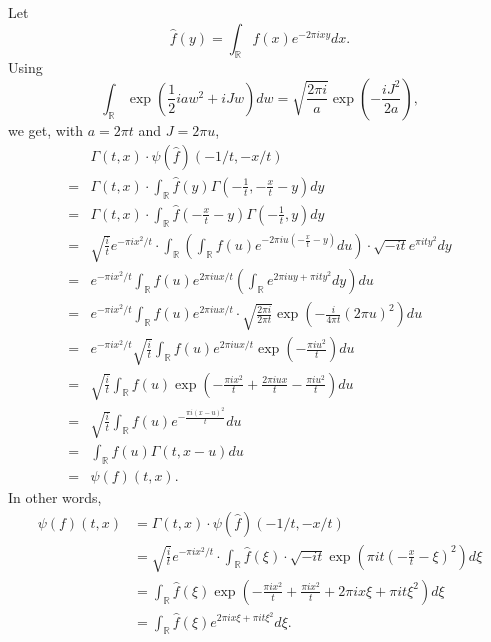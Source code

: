\documentclass{article}
\theoremstyle{definition}
\begin{document}
Let
\[
\widehat{f}(y) = \int_{\mathbb{R}} f(x) e^{-2\pi ixy} dx.
\]
Using
\[
\int_{\mathbb{R}} \exp\left(\frac{1}{2}iaw^2 + iJw\right) dw = \sqrt{ \frac{2\pi i}{a}} \exp\left(-\frac{iJ^2}{2a}\right),
\]
we get, with $a=2\pi t$ and $J=2\pi u$,
\[
\begin{split}
&\Gamma(t,x) \cdot \psi(\widehat{f})(-1/t,-x/t)\\
=&\Gamma(t,x) \cdot \int_{\mathbb{R}} \widehat{f}(y)
\Gamma\left(-\frac{1}{t},-\frac{x}{t}-y\right) dy\\
=&\Gamma(t,x) \cdot \int_{\mathbb{R}} \widehat{f}\left(-\frac{x}{t}-y\right) \Gamma\left(-\frac{1}{t},y\right) dy\\
=&\sqrt{\frac{i}{t}} e^{-\pi ix^2/t} \cdot \int_{\mathbb{R}} \left( \int_{\mathbb{R}} f(u) e^{-2\pi i u\left(-\frac{x}{t}-y\right)}
du\right) \cdot \sqrt{-it} e^{\pi i t y^2} dy\\
=&e^{-\pi ix^2/t} \int_{\mathbb{R}} f(u) e^{2\pi iux/t} \left( \int_{\mathbb{R}} e^{2\pi iuy+\pi ity^2} dy\right) du\\
=&e^{-\pi ix^2/t} \int_{\mathbb{R}} f(u) e^{2\pi iux/t}  \cdot \sqrt{\frac{2\pi i}{2\pi t}} \exp\left(-\frac{i}{4\pi t} (2\pi u)^2 \right) du\\
=&e^{-\pi ix^2/t} \sqrt{\frac{i}{t}} \int_{\mathbb{R}} f(u) e^{2\pi iux/t} \exp\left(-\frac{\pi iu^2}{t}\right) du\\
=&\sqrt{\frac{i}{t}} \int_{\mathbb{R}} f(u) \exp\left(-\frac{\pi ix^2}{t}+\frac{2\pi iux}{t} - \frac{\pi iu^2}{t} \right) du\\
=&\sqrt{\frac{i}{t}} \int_{\mathbb{R}} f(u) e^{-\frac{\pi i(x-u)^2}{t}} du\\
=&\int_{\mathbb{R}} f(u) \Gamma(t,x-u) du\\
=&\psi(f)(t,x).
\end{split}
\]
In other words,
\begin{align*}
\psi(f)(t,x)&=\Gamma(t,x) \cdot \psi(\widehat{f})(-1/t,-x/t)\\
&=\sqrt{\frac{i}{t}} e^{-\pi ix^2/t} \cdot \int_{\mathbb{R}} \widehat{f}(\xi) \cdot \sqrt{-it} \exp\left(\pi it \left(-\frac{x}{t}-\xi\right)^2 \right) d\xi\\
&=\int_{\mathbb{R}} \widehat{f}(\xi)  \exp\left(-\frac{\pi ix^2}{t} + \frac{\pi ix^2}{t} + 2 \pi i x\xi + \pi i t \xi^2 \right) d\xi\\
&=\int_{\mathbb{R}} \widehat{f}(\xi) e^{2\pi ix\xi + \pi it\xi^2} d\xi.
\end{align*}
\end{document}
